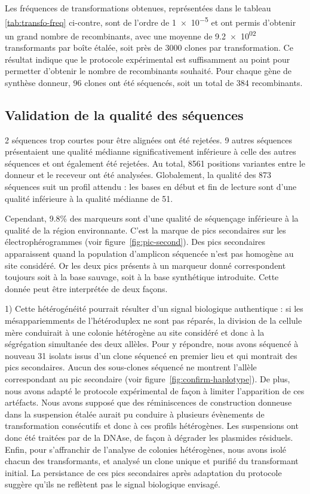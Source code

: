 Les fréquences de transformations obtenues, représentées dans le tableau
\ref{tab:transfo-freq} ci-contre, sont de l'ordre de \num{1e-5} et ont permis
d'obtenir un grand nombre de recombinants, avec une moyenne de \num{9.2e+02}
transformants par boîte étalée, soit près de \num{3000} clones par
transformation. Ce résultat indique que le protocole expérimental est
suffisamment au point pour permetter d'obtenir le nombre de recombinants
souhaité. Pour chaque gène de synthèse donneur, \num{96} clones ont été
séquencés, soit un total de \num{384} recombinants.

\subsection{Validation de la qualité des séquences}
\label{sub:result-qualite}

2 séquences trop courtes pour être alignées ont été rejetées. 9 autres séquences
présentaient une qualité médianne significativement inférieure à celle des
autres séquences et ont également été rejetées. Au total, \num{8561} positions
variantes entre le donneur et le receveur ont été analysées. Globalement, la
qualité des \num{873} séquences suit un profil attendu : les bases en début et
fin de lecture sont d'une qualité inférieure à la qualité médianne de \num{51}.

Cependant, \num{9.8}\% des marqueurs sont d'une qualité de séquençage inférieure
à la qualité de la région environnante. C'est la marque de pics secondaires sur
les électrophérogrammes (voir figure~\ref{fig:pic-second}). Des pics secondaires
apparaissent quand la population d'amplicon séquencée n'est pas homogène au site
considéré. Or les deux pics présents à un marqueur donné correspondent toujours
soit à la base sauvage, soit à la base synthétique introduite. Cette donnée peut
être interprétée de deux façons.

1) Cette hétérogénéité pourrait résulter d'un signal biologique authentique : si
les mésappariemments de l'hétéroduplex ne sont pas réparés, la division de la
cellule mère conduirait à une colonie hétérogène au site considéré et donc à la
ségrégation simultanée des deux allèles. Pour y répondre, nous avons séquencé à
nouveau 31 isolats issus d'un clone séquencé en premier lieu et qui montrait des
pics secondaires. Aucun des sous-clones séquencé ne montrent l'allèle
correspondant au pic secondaire (voir figure~\ref{fig:confirm-haplotype}). De
plus, nous avons adapté le protocole expérimental de façon à limiter
l'apparition de ces artéfacts. Nous avons supposé que des réminiscences de
construction donneuse dans la suspension étalée aurait pu conduire à plusieurs
évènements de transformation consécutifs et donc à ces profils hétérogènes. Les
suspensions ont donc été traitées par de la DNAse, de façon à dégrader les
plasmides résiduels. Enfin, pour s'affranchir de l'analyse de colonies
hétérogènes, nous avons isolé chacun des transformants, et analysé un clone
unique et purifié du transformant initial. La persistance de ces pics
secondaires après adaptation du protocole suggère qu'ils ne reflètent pas le
signal biologique envisagé.


